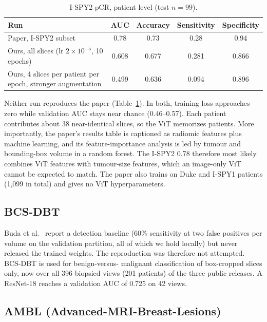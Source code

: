 \documentclass[11pt]{article}
\begin{document}
\begin{table}[htbp]
  \centering
  \caption{I-SPY2 pCR, patient level (test $n = 99$).}
  \label{tab:pcr}
  \begin{tabular}{@{}l c c c c@{}}
    \toprule
    Run & AUC & Accuracy & Sensitivity & Specificity \\
    \midrule
    Paper, I-SPY2 subset & 0.78 & 0.73 & 0.28 & 0.94 \\
    Ours, all slices (lr $2\times10^{-5}$, 10 epochs) & 0.608 & 0.677 & 0.281 & 0.866 \\
    Ours, 4 slices per patient per epoch, stronger augmentation & 0.499 & 0.636 & 0.094 & 0.896 \\
    \bottomrule
  \end{tabular}
\end{table}

Neither run reproduces the paper (Table~\ref{tab:pcr}). In both, training
loss approaches zero while validation AUC stays near chance (0.46--0.57). Each
patient contributes about 38 near-identical slices, so the ViT memorizes
patients. More importantly, the paper's results table is captioned as
radiomic features plus machine learning, and its feature-importance analysis
is led by tumour and bounding-box volume in a random forest. The I-SPY2 0.78
therefore most likely combines ViT features with tumour-size features, which
an image-only ViT cannot be expected to match. The paper also trains on Duke
and I-SPY1 patients (1,099 in total) and gives no ViT hyperparameters.

\subsection{BCS-DBT}

Buda et al.\ \citep{buda2021bcsdbt} report a detection baseline (60\%
sensitivity at two false positives per volume on the validation partition,
all of which we hold locally) but never released the trained weights. The
reproduction was therefore not attempted. BCS-DBT is used for benign-versus-
malignant classification of box-cropped slices only, now over all 396
biopsied views (201 patients) of the three public releases. A ResNet-18
reaches a validation AUC of 0.725 on 42 views.

\subsection{AMBL (Advanced-MRI-Breast-Lesions)}
\label{sec:ambl}
\end{document}
